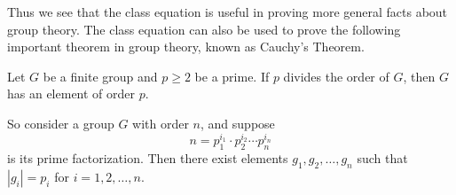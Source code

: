     Thus we see that the class equation is useful in proving more
    general facts about group theory. The class equation can also be
    used to prove the following important theorem in group theory,
    known as Cauchy's Theorem. 

    \begin{thm}
        Let $G$ be a finite group and $p \ge 2$ be a prime. If $p$ divides
        the order of $G$, then $G$ has an element of order $p$. 
    \end{thm}

    \noindent\textcolor{NavyBlue}{So consider a group $G$ with order $n$,
    and suppose 
    \[ n = p_1^{i_1}\cdot p_2^{i_2} \cdots
    p_n^{i_n}
    \]
    is its prime factorization. Then there exist elements
    $g_1, g_2, \dots, g_n$ such that $|g_i| = p_i$ for $i = 1, 2,
    \dots, n$.}

